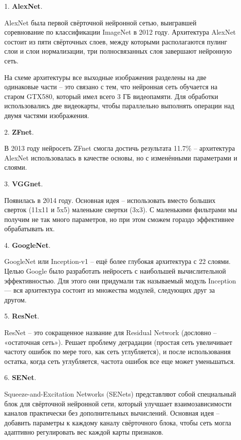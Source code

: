 \begin{enumerate}
\item[1.] \textbf{AlexNet}.

AlexNet была первой свёрточной нейронной сетью, выигравшей соревнование по классификации ImageNet в 2012 году. Архитектура AlexNet состоит из пяти свёрточных слоев, между которыми располагаются пулинг слои и слои нормализации, три полносвязанных слоя завершают нейронную сеть.

На схеме архитектуры все выходные изображения разделены на две одинаковые части -- это связано с тем, что нейронная сеть обучается на старом GTX580, который имел всего 3 ГБ видеопамяти. Для обработки использовались две видеокарты, чтобы параллельно выполнять операции над двумя частями изображения.

\item[2.] \textbf{ZFnet}.

В 2013 году нейросеть ZFnet смогла достичь результата 11.7\% -- архитектура AlexNet использовалась в качестве основы, но с изменёнными параметрами и слоями. 

\item[3.] \textbf{VGGnet}.

Появилась в 2014 году. Основная идея -- использовать вместо больших сверток (11x11 и 5x5) маленькие свертки (3x3). С маленькими фильтрами мы получим не так много параметров, но при этом сможем гораздо эффективнее обрабатывать их.

\item[4.] \textbf{GoogleNet}.

GoogleNet или Inception-v1 -- ещё более глубокая архитектура с 22 слоями. Целью Google было разработать нейросеть с наибольшей вычислительной эффективностью. Для этого они придумали так называемый модуль Inception --- вся архитектура состоит из множества модулей, следующих друг за другом.

\item[5.] \textbf{ResNet}.

ResNet -- это сокращенное название для Residual Network (дословно -- «остаточная сеть»). Решает проблему деградации (простая сеть увеличивает частоту ошибок по мере того, как сеть углубляется), и после использования остатка, когда сеть углубляется, частота ошибок все еще может уменьшаться.

\item[6.] \textbf{SENet}.

Squeeze-and-Excitation Networks (SENets) представляют собой специальный блок для свёрточной нейронной сети, который улучшает взаимозависимости каналов практически без дополнительных вычислений. Основная идея -- добавить параметры к каждому каналу свёрточного блока, чтобы сеть могла адаптивно регулировать вес каждой карты признаков. 

\end{enumerate}

